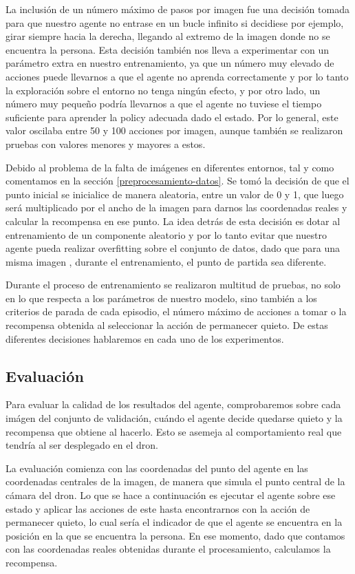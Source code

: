 La inclusión de un número máximo de pasos por imagen fue una decisión tomada para que nuestro agente no entrase en un bucle infinito si decidiese por ejemplo, girar siempre hacia la derecha, llegando al extremo de la imagen donde no se encuentra la persona. Esta decisión también nos lleva a experimentar con un parámetro extra en nuestro entrenamiento, ya que un número muy elevado de acciones puede llevarnos a que el agente no aprenda correctamente y por lo tanto la exploración sobre el entorno no tenga ningún efecto, y por otro lado, un número muy pequeño podría llevarnos a que el agente no tuviese el tiempo suficiente para aprender la policy adecuada dado el estado. Por lo general, este valor oscilaba entre 50 y 100 acciones por imagen, aunque también se realizaron pruebas con valores menores y mayores a estos.
\medskip

Debido al problema de la falta de imágenes en diferentes entornos, tal y como comentamos en la sección \ref{preprocesamiento-datos}. Se tomó la decisión de que el punto inicial se inicialice de manera aleatoria, entre un valor de 0 y 1, que luego será multiplicado por el ancho de la imagen para darnos las coordenadas reales y calcular la recompensa en ese punto. La idea detrás de esta decisión es dotar al entrenamiento de un componente aleatorio y por lo tanto evitar que nuestro agente pueda realizar overfitting sobre el conjunto de datos, dado que para una misma imagen , durante el entrenamiento, el punto de partida sea diferente.
\medskip

Durante el proceso de entrenamiento se realizaron multitud de pruebas, no solo en lo que respecta a los parámetros de nuestro modelo, sino también a los criterios de parada de cada episodio, el número máximo de acciones a tomar o la recompensa obtenida al seleccionar la acción de permanecer quieto. De estas diferentes decisiones hablaremos en cada uno de los experimentos.
\medskip

\subsection{Evaluación}
\label{evaluacion}

Para evaluar la calidad de los resultados del agente, comprobaremos sobre cada imágen del conjunto de validación, cuándo el agente decide quedarse quieto y la recompensa que obtiene al hacerlo. Esto se asemeja al comportamiento real que tendría al ser desplegado en el dron.
\medskip

La evaluación comienza con las coordenadas del punto del agente en las coordenadas centrales de la imagen, de manera que simula el punto central de la cámara del dron. Lo que se hace a continuación es ejecutar el agente sobre ese estado y aplicar las acciones de este hasta encontrarnos con la acción de permanecer quieto, lo cual sería el indicador de que el agente se encuentra en la posición en la que se encuentra la persona. En ese momento, dado que contamos con las coordenadas reales obtenidas durante el procesamiento, calculamos la recompensa.
\medskip

